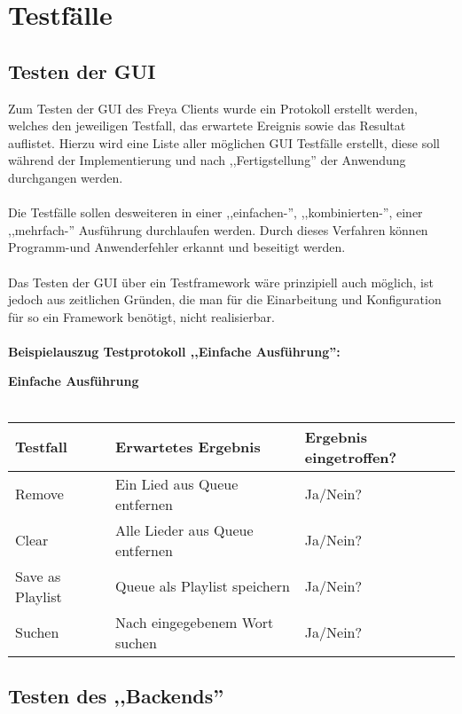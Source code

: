 \section{Testfälle}

\subsection{Testen der GUI}
Zum Testen der GUI des Freya Clients wurde ein Protokoll erstellt werden, welches den
jeweiligen Testfall, das erwartete Ereignis sowie das Resultat auflistet. Hierzu wird
eine Liste aller möglichen GUI Testfälle erstellt, diese soll während der Implementierung 
und nach ,,Fertigstellung'' der Anwendung durchgangen werden.
\\
\\
Die Testfälle sollen desweiteren in einer ,,einfachen-'', ,,kombinierten-'', einer ,,mehrfach-''
Ausführung durchlaufen werden.
Durch dieses Verfahren können Programm-und Anwenderfehler erkannt und beseitigt werden.
\\
\\ 
Das Testen der GUI über ein Testframework wäre prinzipiell auch möglich, ist jedoch aus zeitlichen
Gründen, die man für die Einarbeitung und Konfiguration für so ein Framework benötigt, nicht realisierbar.
\\
\\
\textbf{Beispielauszug Testprotokoll ,,Einfache Ausführung'':}

\textbf{Einfache Ausführung}\ \\ \\
\begin{tabularx}{\textwidth}{|X|X|l|}
    \hline
    \textbf{Testfall} & \textbf{Erwartetes Ergebnis} & \textbf{Ergebnis eingetroffen?}\\
    \hline
    Remove & Ein Lied aus Queue entfernen & Ja/Nein?\\
    \hline
    Clear & Alle Lieder aus Queue entfernen & Ja/Nein?\\
    \hline
    Save as Playlist & Queue als Playlist speichern & Ja/Nein?\\
    \hline
    Suchen & Nach eingegebenem Wort suchen & Ja/Nein?\\
    \hline
\end{tabularx}


\subsection{Testen des ,,Backends''}

